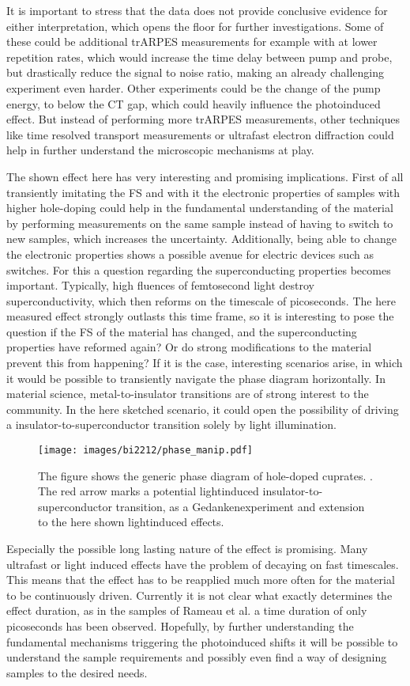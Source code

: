 It is important to stress that the data does not provide conclusive evidence for either interpretation, which opens the floor for further investigations.
Some of these could be additional trARPES measurements for example with at lower repetition rates, which would increase the time delay between pump and probe, but drastically reduce the signal to noise ratio, making an already challenging experiment even harder.
Other experiments could be the change of the pump energy, to below the CT gap, which could heavily influence the photoinduced effect.
But instead of performing more trARPES measurements, other techniques like time resolved transport measurements or ultrafast electron diffraction could help in further understand the microscopic mechanisms at play.

The shown effect here has very interesting and promising implications.
First of all transiently imitating the FS and with it the electronic properties of samples with higher hole-doping could help in the fundamental understanding of the material by performing measurements on the same sample instead of having to switch to new samples, which increases the uncertainty.
Additionally, being able to change the electronic properties shows a possible avenue for electric devices such as switches.
For this a question regarding the superconducting properties becomes important.
Typically, high fluences of femtosecond light destroy superconductivity, which then reforms on the timescale of picoseconds.
The here measured effect strongly outlasts this time frame, so it is interesting to pose the question if the FS of the material has changed, and the superconducting properties have reformed again?
Or do strong modifications to the material prevent this from happening?
If it is the case, interesting scenarios arise, in which it would be possible to transiently navigate the phase diagram horizontally.
In material science, metal-to-insulator transitions are of strong interest to the community.
In the here sketched scenario, it could open the possibility of driving a insulator-to-superconductor transition solely by light illumination.

\begin{figure}
	\centering
	\texttt{[image: images/bi2212/phase\_manip.pdf]}
	\caption{The figure shows the generic phase diagram of hole-doped cuprates. \cite{keimer_quantum_2015}. The red arrow marks a potential lightinduced insulator-to-superconductor transition, as a Gedankenexperiment and extension to the here shown lightinduced effects.}
	\label{fig:phasemanip}
\end{figure}

Especially the possible long lasting nature of the effect is promising.
Many ultrafast or light induced effects have the problem of decaying on fast timescales.
This means that the effect has to be reapplied much more often for the material to be continuously driven.
Currently it is not clear what exactly determines the effect duration, as in the samples of Rameau et al. \cite{rameau_photoinduced_2014} a time duration of only picoseconds has been observed.
Hopefully, by further understanding the fundamental mechanisms triggering the photoinduced shifts it will be possible to understand the sample requirements and possibly even find a way of designing samples to the desired needs.